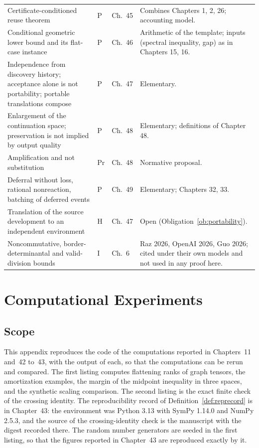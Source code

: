 \documentclass[11pt,letterpaper]{report}
\theoremstyle{plain}
\theoremstyle{definition}
\theoremstyle{remark}
\begin{document}
{\begin{longtable}{p{}p{}p{}p{}}
Certificate-conditioned reuse theorem & P & Ch.\ 45 & Combines Chapters 1, 2, 26; accounting model.\\
Conditional geometric lower bound and its flat-case instance & P & Ch.\ 46 & Arithmetic of the template; inputs (spectral inequality, gap) as in Chapters 15, 16.\\
Independence from discovery history; acceptance alone is not portability; portable translations compose & P & Ch.\ 47 & Elementary.\\
Enlargement of the continuation space; preservation is not implied by output quality & P & Ch.\ 48 & Elementary; definitions of Chapter 48.\\
Amplification and not substitution & Pr & Ch.\ 48 & Normative proposal.\\
Deferral without loss, rational nonreaction, batching of deferred events & P & Ch.\ 49 & Elementary; Chapters 32, 33.\\
Translation of the source development to an independent environment & H & Ch.\ 47 & Open (Obligation~\ref{ob:portability}).\\
Noncommutative, border-determinantal and valid-division bounds & I & Ch.\ 6 & Raz 2026, OpenAI 2026, Guo 2026; cited under their own models and not used in any proof here.\\
\hline
\end{longtable}
}

\chapter{Computational Experiments}\label{ch:experiments}

\section{Scope}

This appendix reproduces the code of the computations reported in Chapters~11 and~42 to~43, with the output of each, so that the computations can be rerun and compared. The first listing computes flattening ranks of graph tensors, the amortization examples, the margin of the midpoint inequality in three spaces, and the synthetic scaling comparison. The second listing is the exact finite check of the crossing identity. The reproducibility record of Definition~\ref{def:reprecord} is in Chapter~43: the environment was Python 3.13 with SymPy 1.14.0 and NumPy 2.5.3, and the source of the crossing-identity check is the manuscript with the digest recorded there. The random number generators are seeded in the first listing, so that the figures reported in Chapter~43 are reproduced exactly by it.
\end{document}
